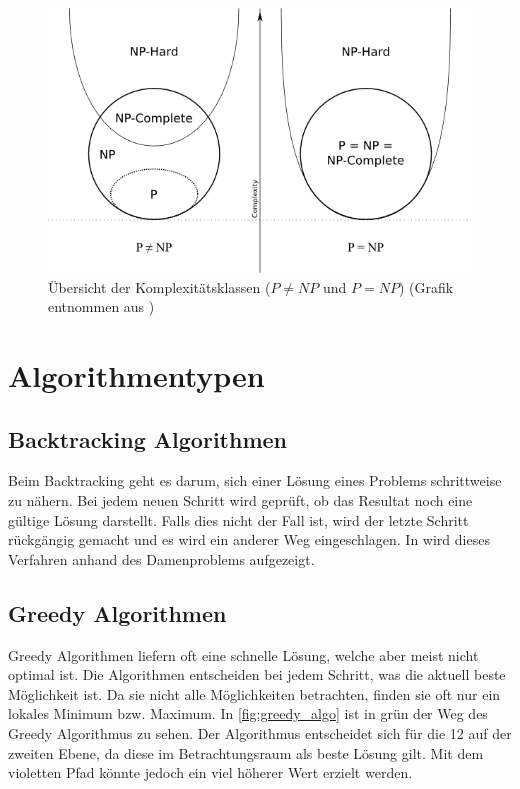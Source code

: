 \begin{figure}[h]
\includegraphics[scale=0.65]{images/einleitung/p_np_np-complete_np-hard.png}
\caption[Übersicht der Komplexitätsklassen ($P!=NP$ und $P=NP$)]{Übersicht der Komplexitätsklassen ($P \neq NP$ und $P=NP$) (Grafik entnommen aus \cite{pic_p_np})}
\label{fig:complexity_overview}
\end{figure}

\section{Algorithmentypen}\label{algo_types}

\subsection{Backtracking Algorithmen}\label{backtracking_algos}
Beim Backtracking geht es darum, sich einer Lösung eines Problems schrittweise zu nähern. Bei jedem neuen Schritt wird geprüft, ob das Resultat noch eine gültige Lösung darstellt. Falls dies 
nicht der Fall ist, wird der letzte Schritt rückgängig gemacht und es wird ein anderer Weg eingeschlagen. In \cite{backtracking} wird dieses Verfahren anhand des Damenproblems aufgezeigt.

\subsection{Greedy Algorithmen}\label{greedy_algos}
Greedy Algorithmen liefern oft eine schnelle Lösung, welche aber meist nicht optimal ist. Die Algorithmen entscheiden bei jedem Schritt, was die aktuell beste Möglichkeit ist. Da sie nicht alle 
Möglichkeiten betrachten, finden sie oft nur ein lokales Minimum bzw. Maximum. In \autoref{fig:greedy_algo} ist in grün der Weg des Greedy Algorithmus zu sehen. Der Algorithmus entscheidet 
sich für die 12 auf der zweiten Ebene, da diese im Betrachtungsraum als beste Lösung gilt. Mit dem violetten Pfad könnte jedoch ein viel höherer Wert erzielt werden.

